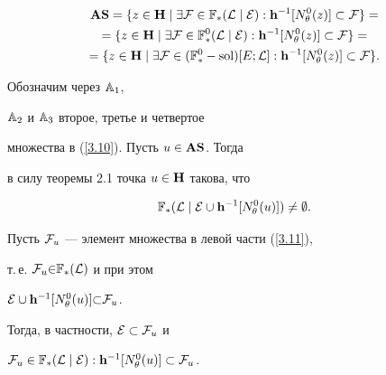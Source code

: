 {\begin{props}
\begin{multline}
{{\bold A}{\bold S}} = \{z \in {\bold H} \mid \exi{\cal F} \in


{{\Bbb F}_*}({\cal L}\mid{\cal E}):{{\bold h}^{-1}}[{N_\theta^0}(z)]


\subset {\cal F}\} = \\


= \{z \in {\bold H} \mid \exi{\cal F} \in


{{\Bbb F}_*^0}({\cal L}\mid{\cal E}):


{{\bold h}^{-1}}[{N_\theta^0}(z)] \subset {\cal F}\} = \\


=\{z \in {\bold H} \mid \exi{\cal F} \in


({{\Bbb F}_*^0}-\sol)[E;{\cal


L}] : {{\bold h}^{-1}}[{N_\theta^0}(z)] \subset {\cal F}\}.


\end{multline}


\end{props}








\begin{pf}


Обозначим через ${{\Bbb A}_1}$,


${{\Bbb A}_2}$ и ${\Bbb A}_3$ второе, третье и четвертое


множества в (\ref{3.10}). Пусть $u \in {{\bold A}{\bold S}}$. Тогда


в силу теоремы 2.1 точка $u \in {\bold H}$ такова, что


\begin{equation}\label{3.11}


{{\Bbb F}_*}({\cal L}\mid{\cal E}\cup{{\bold h}^{-1}}[{N_\theta^0}(u)])


\ne \emp.


\end{equation}


Пусть ${\cal F}_u$ --- элемент множества в левой части (\ref{3.11}),


т.\,е. ${{\cal F}_u} {\in} {{\Bbb F}_*}({\cal L})$ и при этом


${\cal E}\cup{{\bold h}^{-1}}[{N_\theta^0}(u)] {\subset} {{\cal F}_u}$.


Тогда, в частности, ${\cal E} \subset {{\cal F}_u}$ и 


${\cal F}_u \in {{\Bbb F}_*}({\cal L}\mid{\cal E}):


{{\bold h}^{-1}}[{N_\theta^0}(u)] \subset {{\cal F}_u}$.



\end{pf}}
